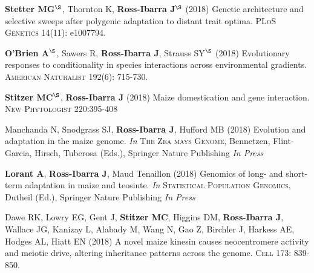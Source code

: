 \documentclass[letterpaper,10pt]{article}
\begin{document}
\begin{etaremune}
\item \textbf{Stetter MG}$^\S$, Thornton K, \textbf{Ross-Ibarra J}$^\S$ (2018) Genetic architecture and selective sweeps after polygenic adaptation to distant trait optima. \textsc{PLoS Genetics} 14(11): e1007794. %

\item \textbf{O'Brien A}$^\S$, Sawers R, \textbf{Ross-Ibarra J}, Strauss  SY$^\S$ (2018) Evolutionary responses to conditionality in species interactions across environmental gradients. \textsc{American Naturalist} 192(6): 715-730.

\item \textbf{Stitzer MC}$^\S$, \textbf{Ross-Ibarra J} (2018) Maize domestication and gene interaction. \textsc{New Phytologist} 220:395-408

\item Manchanda N, Snodgrass SJ, \textbf{Ross-Ibarra J}, Hufford MB (2018) Evolution and adaptation in the maize genome. \textit{In} \textsc{The Zea mays Genome}, Bennetzen, Flint-Garcia, Hirsch, Tuberosa (Eds.), Springer Nature Publishing \textit{In Press}

\item \textbf{Lorant A}, \textbf{Ross-Ibarra J}, Maud Tenaillon (2018) Genomics of long- and short- term adaptation in maize and teosinte. \textit{In} \textsc{Statistical Population Genomics},  Dutheil (Ed.), Springer Nature Publishing \textit{In Press}

\item Dawe RK, Lowry EG, Gent J, \textbf{Stitzer MC}, Higgins DM, \textbf{Ross-Ibarra J}, Wallace JG, Kanizay L, Alabady M, Wang N, Gao Z, Birchler J, Harkess AE, Hodges AL, Hiatt EN (2018) A novel maize kinesin causes neocentromere activity and meiotic drive, altering inheritance patterns across the genome. \textsc{Cell} 173: 839-850.


\end{etaremune}
\end{document}

